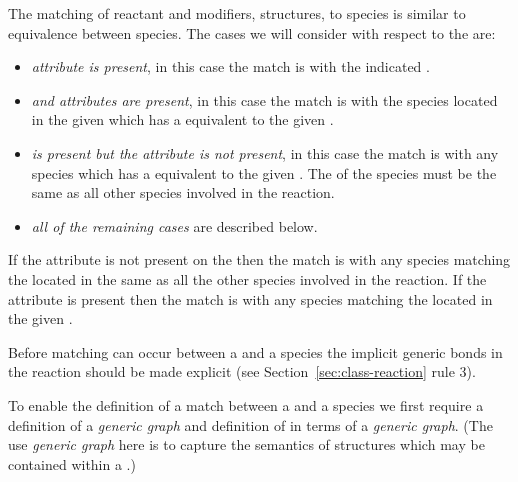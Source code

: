 \documentclass{cekarticle}
\begin{document}
The matching of reactant and modifiers,  structures,
to species is similar to equivalence between species.
The cases we will consider with respect to the  are:
\begin{itemize}

\item \emph{ attribute is present}, in this case the match is with the indicated
.

\item \emph{ and 
attributes are present}, in this case the match is with the
species located in the given  which has a
 equivalent to the given .

\item \emph{ is present but the  attribute is not present},
in this case the match is
with any species which has a  equivalent to
the given .  The  of the species must be the same as
all other species involved in the reaction.

\item \emph{all of the remaining cases} are described below.
\end{itemize}

If the  attribute is not present on the
 then the match is with any species
 matching the  located in the same
 as all the other species involved in the
reaction. If the  attribute is present then
the match is with any species matching the
 located in the given
.

Before matching can occur between a 
and a species the implicit generic bonds in the reaction should be
made explicit (see Section~\ref{sec:class-reaction} rule 3).

To enable the definition of a match between a
 and a species we first require a
definition of a \emph{generic graph} and definition of
 in terms of a \emph{generic graph}.
(The use \emph{generic graph} here is to capture the semantics of
 structures which may be contained within a
.)
\end{document}
